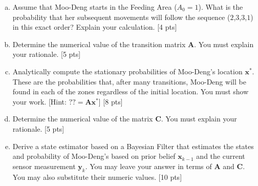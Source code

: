 \begin{enumerate}[a)]
    \item Assume that Moo-Deng starts in the Feeding Area ($A_0=1$). What is the probability that her subsequent movements will follow the sequence ($2$,$3$,$3$,$1$) in this exact order? Explain your calculation. [4 pts]
    \item Determine the numerical value of the transition matrix $\mathbf{A}$. You must explain your rationale. [5 pts]
    \item Analytically compute the stationary probabilities of Moo-Deng’s location $\mathbf{x}^*$. These are the probabilities that, after many transitions, Moo-Deng will be found in each of the zones regardless of the initial location. You must show your work. [Hint: $??=\mathbf{A}\mathbf{x}^*$] [8 pts]
    
\item Determine the numerical value of the  matrix $\mathbf{C}$. You must explain your rationale. [5 pts]
    
    \item Derive a state estimator based on a Bayesian Filter that estimates the states and probability of Moo-Deng's  based on prior belief $\mathbf{x}_{k-1}$ and the current sensor measurement $\mathbf{y}_k$. You may leave your answer in terms of $\mathbf{A}$ and $\mathbf{C}$. You may also substitute their numeric values. [10 pts]
\end{enumerate}
